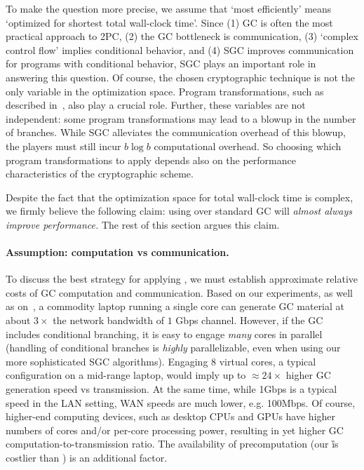 To make the question more precise, we assume that `most efficiently' means
`optimized for shortest total wall-clock time'.
Since
(1) GC is often the most practical approach to 2PC,
(2) the GC bottleneck is communication,
(3) `complex control flow' implies conditional behavior, and
(4) SGC improves communication for programs with conditional behavior,
SGC plays an important role in answering this question.
%
Of course, the chosen cryptographic technique is not the only variable
in the optimization space.
Program transformations, such as described
in~, also play a crucial role.
%
Further, these variables are not independent:
some program transformations may lead to a blowup in the number of
branches.
While SGC alleviates the communication overhead of this blowup, the
players must still incur $b \log b$ computational overhead.
%
So choosing which program transformations to apply depends also on the
performance characteristics of the cryptographic scheme.

Despite the fact that the optimization space for total wall-clock time
is complex, we firmly believe the following claim:
using \ourschemelong over standard GC will \emph{almost always improve
  performance.}
The rest of this section argues this claim.

\paragraph{Assumption: computation vs communication.} 
To discuss the best strategy for applying \ourscheme, we must establish
approximate relative costs of GC computation and communication.  Based
on our experiments, as well as on~\cite{XiaoPersonalComm}, a commodity
laptop running a single core can generate GC material at about $3\times$ the
network bandwidth of $1$ Gbps channel.
%
However, if the GC includes conditional branching, it is easy to
engage \emph{many} cores in parallel (handling of conditional branches
is \emph{highly} parallelizable, even when using our more
sophisticated SGC algorithms).
%
Engaging  $8$ virtual cores, a
typical configuration on a mid-range laptop, would imply up to
$\approx 24\times$ higher GC generation speed vs transmission.
%
At the same time, while 1Gbps is a typical speed in the LAN setting, WAN
speeds are much lower, e.g. 100Mbps.
%
Of course, higher-end computing devices, such as desktop CPUs and GPUs
have higher numbers of cores and/or per-core processing power,
resulting in yet higher GC computation-to-transmission ratio.
%
The availability of precomputation (our \G is costlier than \E) is an
additional factor.

